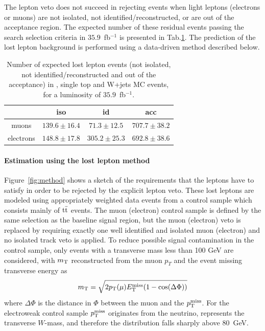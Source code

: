 The lepton veto does not succeed in rejecting events when light leptons (electrons or muons) are not isolated, not identified/reconstructed, or are out of the acceptance region. The expected number of these residual events passing the search selection criteria in $35.9$~fb$^{-1}$ is presented in Tab.\ref{tab:nexpLL}. The prediction of the lost lepton background is performed using a data-driven method described below.

\begin{table}[htbp]
\fontsize{10 pt}{1.2 em}
\caption{Number of expected lost lepton events (not isolated, not identified/reconstructed and out of the acceptance) in \ttbar, single top and W+jets MC events, for a luminosity of $35.9$~fb$^{-1}$.} 
\begin{center}
\begin{tabular}{|c|c|c|c|}
\hline
          & iso  & id   & acc \\
\hline
muons     & $139.6\pm16.4$ & $71.3\pm12.5$ & $707.7\pm38.2$ \\
electrons & $148.8\pm17.8$ & $305.2\pm25.3$ & $692.8\pm38.6$ \\
\hline\end{tabular}
\end{center}
\label{tab:nexpLL}
\end{table}

\paragraph{Estimation using the lost lepton method}

Figure~\ref{fig:method} shows a sketch of the requirements that the 
leptons have to satisfy in order to be rejected by the explicit lepton veto.
These lost leptons are modeled using appropriately weighted data events 
from a control sample which consists mainly of ${\rm t\bar{t}}$ events. 
The muon (electron) control sample is defined by the same selection 
as the baseline signal region, but the muon (electron) veto is replaced by 
requiring exactly one well identified and isolated muon (electron) and no 
isolated track veto is applied.
To reduce possible signal contamination in the control sample,
only events with a transverse mass less than 100 GeV are considered, with
$m_{\rm T}$ reconstructed from the muon $p_{T}$ and the event 
missing transverse energy as
\begin{equation}
m_{\rm T} = \sqrt{2 p_{\rm T}(\mu) E^{\rm miss}_{\rm T} (1 - \cos(\Delta \Phi))}
\label{eq:MWT}
\end{equation}
where $\Delta \Phi$ is the distance in $\Phi$ between the muon and 
the $p^{\rm miss}_{\rm T}$. For the electroweak control sample 
$p^{\rm miss}_{\rm T}$ originates from the neutrino, \MT represents the 
transverse $W$-mass, and therefore the distribution 
falls sharply above $80$~GeV.

